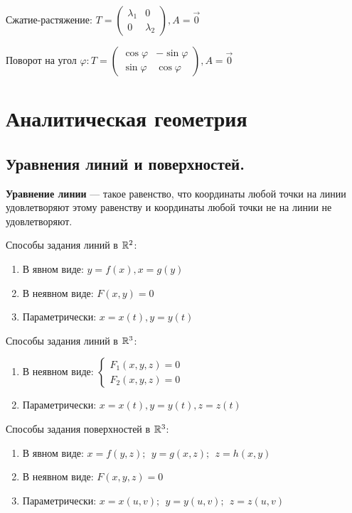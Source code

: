 Сжатие-растяжение: $T=\begin{pmatrix}
        \lambda_1 & 0         \\
        0         & \lambda_2
    \end{pmatrix}, A=\vec 0$

Поворот на угол $\varphi: T=\begin{pmatrix}
        \cos\varphi & -\sin\varphi \\
        \sin\varphi & \cos\varphi
    \end{pmatrix}, A=\vec 0$

\section{Аналитическая геометрия}

\subsection{Уравнения линий и поверхностей.}
\begin{definition}
    \textbf{Уравнение линии} --- такое равенство, что координаты любой точки на линии удовлетворяют этому равенству и координаты любой точки не на линии не удовлетворяют.
\end{definition}
Способы задания линий в $\mathbb{R}^2$:
\begin{enumerate}
    \item В явном виде: $y=f(x), x=g(y)$
    \item В неявном виде: $F(x,y)=0$
    \item Параметрически: $x=x(t), y=y(t)$
\end{enumerate}
Способы задания линий в $\mathbb{R}^3$:
\begin{enumerate}
    \item В неявном виде: $\begin{cases}F_1(x,y,z)=0 \\ F_2(x,y,z)=0\end{cases}$
    \item Параметрически: $x=x(t), y=y(t), z=z(t)$
\end{enumerate}
Способы задания поверхностей в $\mathbb{R}^3$:
\begin{enumerate}
    \item В явном виде: $x=f(y,z);\ \ y=g(x,z);\ \ z=h(x,y)$
    \item В неявном виде: $F(x,y,z)=0$
    \item Параметрически: $x=x(u,v);\ \ y=y(u,v);\ \ z=z(u,v)$
\end{enumerate}

